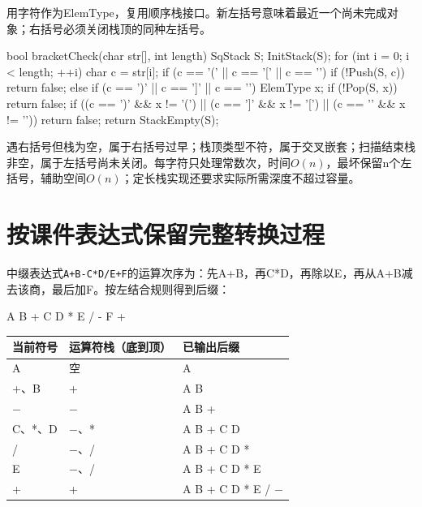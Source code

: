 用字符作为ElemType，复用顺序栈接口。新左括号意味着最近一个尚未完成对象；右括号必须关闭栈顶的同种左括号。

\par\medskip\noindent\begin{minipage}{\linewidth}
\begin{codeblock}[language=C++]
bool bracketCheck(char str[], int length) {
    SqStack S;
    InitStack(S);
    for (int i = 0; i < length; ++i) {
        char c = str[i];
        if (c == '(' || c == '[' || c == '{') {
            if (!Push(S, c)) return false;
        } else if (c == ')' || c == ']' || c == '}') {
            ElemType x;
            if (!Pop(S, x)) return false;
            if ((c == ')' && x != '(') ||
                (c == ']' && x != '[') ||
                (c == '}' && x != '{')) return false;
        }
    }
    return StackEmpty(S);
}
\end{codeblock}
\end{minipage}\par\medskip

遇右括号但栈为空，属于右括号过早；栈顶类型不符，属于交叉嵌套；扫描结束栈非空，属于左括号尚未关闭。每字符只处理常数次，时间\(O(n)\)，最坏保留n个左括号，辅助空间\(O(n)\)；定长栈实现还要求实际所需深度不超过容量。

\section{按课件表达式保留完整转换过程}\label{DS03-expression-trace}

中缀表达式\texttt{A+\allowbreak{}B-C*\allowbreak{}D/\allowbreak{}E+\allowbreak{}F}的运算次序为：先A+B，再C*D，再除以E，再从A+B减去该商，最后加F。按左结合规则得到后缀：

\par\medskip\noindent\begin{minipage}{\linewidth}
\begin{codeblock}[language={}]
A B + C D * E / - F +
\end{codeblock}
\end{minipage}\par\medskip

\par\medskip\noindent\begin{minipage}{\linewidth}\fontsize{9.3}{12}\selectfont\begin{tabularx}{\linewidth}{@{}YYY@{}}
\toprule\noalign{}
当前符号 & 运算符栈（底到顶） & 已输出后缀 \\
\midrule\noalign{}


A & 空 & A \\
+、B & + & A B \\
\ensuremath{-} & \ensuremath{-} & A B + \\
C、*、D & \ensuremath{-}、* & A B + C D \\
/ & \ensuremath{-}、/ & A B + C D * \\
E & \ensuremath{-}、/ & A B + C D * E \\
+ & + & A B + C D * E / \ensuremath{-} \\
\bottomrule\end{tabularx}
\end{minipage}\par\medskip

